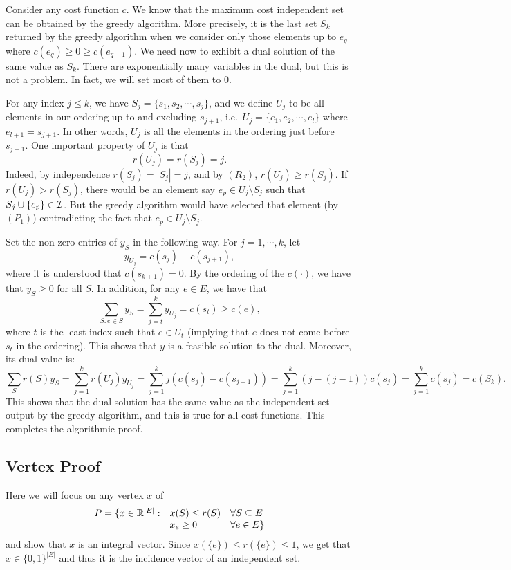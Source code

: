 \documentclass[12pt]{article}
\begin{document}
Consider any cost function $c$. We know that the maximum cost
independent set can be obtained by the greedy algorithm. More
precisely, it is the last set $S_k$ returned by the greedy algorithm
when we consider only those elements up to $e_q$ where $c(e_q)\geq
0\geq c(e_{q+1})$. We need now to exhibit a dual solution of the same
value as $S_k$. There are exponentially many variables in
the dual, but this is not a problem. In fact, we will set most of
them to 0. 

For any index $j\leq k$, we have $S_j=\{s_1, s_2, \cdots, s_j\}$, and
we define $U_j$ to be all elements in our ordering up to and excluding
$s_{j+1}$, i.e.\ $U_j=\{e_1, e_2, \cdots, e_l\}$ where
$e_{l+1}=s_{j+1}$.  In other words, $U_j$ is all the elements in the
ordering just before $s_{j+1}$. One important property
of $U_j$ is that $$r(U_j)=r(S_j)=j.$$ Indeed, by independence
$r(S_j)=|S_j|=j$, and by $(R_2)$, $r(U_j)\geq r(S_j)$. If
$r(U_j)>r(S_j)$, there would be an element say $e_p\in U_j\setminus
S_j$ such that $S_j\cup\{e_p\}\in {\cal I}$. But the greedy algorithm
would have selected that element (by $(P_1)$) contradicting the fact
that $e_p\in U_j\setminus S_j$.

Set the non-zero entries of $y_S$ in the following way. For
$j=1,\cdots, k$, let 
$$y_{U_j}=c(s_j)-c(s_{j+1}),$$where it is understood that
$c(s_{k+1})=0$. By the ordering of the $c(\cdot)$, we have that
$y_S\geq 0$ for all $S$. In addition, for any $e\in E$, we have that 
$$\sum_{S: e\in S} y_S = \sum_{j=t}^k y_{U_j} = c(s_t) \geq c(e),$$
where $t$ is the least index such that $e\in U_t$ (implying that $e$
does not come before $s_t$ in the ordering). This shows that $y$ is a
feasible solution to the dual. Moreover, its dual value is:
$$\sum_S r(S) y_S = \sum_{j=1}^k r(U_j) y_{U_j} = \sum_{j=1}^k j
(c(s_j)-c(s_{j+1})) = \sum_{j=1}^k (j-(j-1)) c(s_j)= \sum_{j=1}^k
c(s_j) = c(S_k).$$ This shows that the dual solution has the same
value as the independent set output by the greedy algorithm, and this
is true for all cost functions. This completes the algorithmic proof.

\subsection{Vertex Proof}
Here we will focus on any vertex $x$ of
$$\begin{array}{rll} 
P = \{x\in {\mathbb R}^{|E|}: & x(S) \leq r(S) & \forall S\subseteq E \\
& x_e \geq 0 & \forall e\in E\}
\end{array}$$
and show that $x$ is an integral vector. Since $x(\{e\})\leq
r(\{e\})\leq 1$, we get that $x\in \{0,1\}^{|E|}$ and thus it is the
incidence vector of an independent set. 
\end{document}
